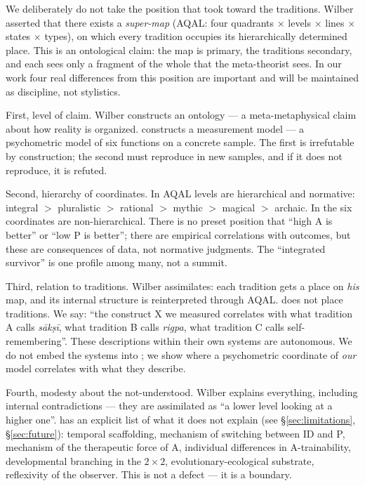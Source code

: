 We deliberately do not take the position that \citet{wilber1995, wilber2000} took toward the traditions. Wilber asserted that there exists a \emph{super-map} (AQAL: four quadrants $\times$ levels $\times$ lines $\times$ states $\times$ types), on which every tradition occupies its hierarchically determined place. This is an ontological claim: the map is primary, the traditions secondary, and each sees only a fragment of the whole that the meta-theorist sees. In our work four real differences from this position are important and will be maintained as discipline, not stylistics.

First, level of claim. Wilber constructs an ontology --- a meta-metaphysical claim about how reality is organized. \DEIC{} constructs a measurement model --- a psychometric model of six functions on a concrete sample. The first is irrefutable by construction; the second must reproduce in new samples, and if it does not reproduce, it is refuted.

Second, hierarchy of coordinates. In AQAL levels are hierarchical and normative: integral $>$ pluralistic $>$ rational $>$ mythic $>$ magical $>$ archaic. In \DEIC{} the six coordinates are non-hierarchical. There is no preset position that ``high A is better'' or ``low P is better''; there are empirical correlations with outcomes, but these are consequences of data, not normative judgments. The ``integrated survivor'' is one profile among many, not a summit.

Third, relation to traditions. Wilber assimilates: each tradition gets a place on \emph{his} map, and its internal structure is reinterpreted through AQAL. \DEIC{} does not place traditions. We say: ``the construct X we measured correlates with what tradition A calls \textit{sākṣī}, what tradition B calls \textit{rigpa}, what tradition C calls self-remembering''. These descriptions within their own systems are autonomous. We do not embed the systems into \DEIC{}; we show where a psychometric coordinate of \emph{our} model correlates with what they describe.

Fourth, modesty about the not-understood. Wilber explains everything, including internal contradictions --- they are assimilated as ``a lower level looking at a higher one''. \DEIC{} has an explicit list of what it does not explain (see §\ref{sec:limitations}, §\ref{sec:future}): temporal scaffolding, mechanism of switching between ID and P, mechanism of the therapeutic force of A, individual differences in A-trainability, developmental branching in the $2\times 2$, evolutionary-ecological substrate, reflexivity of the observer. This is not a defect --- it is a boundary.

